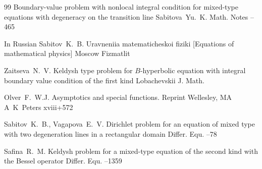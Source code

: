 \begin{thebibliography}{99}
\paper Boundary-value problem with nonlocal integral condition for mixed-type equations with degeneracy on the transition line
\by Sabitova~Yu.~K.
\jour Math. Notes
--465

\lang In Russian
\by Sabitov~K.~B.
\book Uravneniia matematicheskoi fiziki \rm [Equations of mathematical physics]
\publaddr Moscow
\publ Fizmatlit

\by Zaitseva~N.~V.
\paper Keldysh type problem for $B$-hyperbolic equation with integral boundary value condition of the first kind
\jour Lobachevskii J. Math.
\toappear


\by Olver~F.~W.J.
\book Asymptotics and special functions. Reprint
\publaddr Wellesley, MA
\publ A~K~Peters
\totalpages xviii+572 

\by Sabitov~K.~B., Vagapova~E.~V.
\paper Dirichlet problem for an equation of mixed type with two degeneration lines in a rectangular domain
\jour Differ. Equ. 
--78 

\by Safina~R.~M.
\paper Keldysh problem for a mixed-type equation of the second kind with the Bessel operator
\jour Differ. Equ. 
--1359 

\end{thebibliography}

\EngDate

\renewcommand{\baselinestretch}{0.9}


